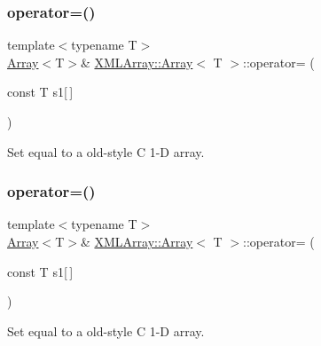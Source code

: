 \subsubsection{\texorpdfstring{operator=()}{operator=()}\hspace{0.1cm}{\footnotesize\ttfamily [8/9]}}
{\footnotesize\ttfamily template$<$typename T$>$ \\
\mbox{\hyperlink{classXMLArray_1_1Array}{Array}}$<$T$>$\& \mbox{\hyperlink{classXMLArray_1_1Array}{X\+M\+L\+Array\+::\+Array}}$<$ T $>$\+::operator= (\begin{DoxyParamCaption}\item[{const T}]{s1\mbox{[}$\,$\mbox{]} }\end{DoxyParamCaption})\hspace{0.3cm}{\ttfamily [inline]}}



Set equal to a old-\/style C 1-\/D array. 

\mbox{\label{classXMLArray_1_1Array_a73e85fb91d2c802400fa356bc3ce77e1}} 
\subsubsection{\texorpdfstring{operator=()}{operator=()}\hspace{0.1cm}{\footnotesize\ttfamily [9/9]}}
{\footnotesize\ttfamily template$<$typename T$>$ \\
\mbox{\hyperlink{classXMLArray_1_1Array}{Array}}$<$T$>$\& \mbox{\hyperlink{classXMLArray_1_1Array}{X\+M\+L\+Array\+::\+Array}}$<$ T $>$\+::operator= (\begin{DoxyParamCaption}\item[{const T}]{s1\mbox{[}$\,$\mbox{]} }\end{DoxyParamCaption})\hspace{0.3cm}{\ttfamily [inline]}}



Set equal to a old-\/style C 1-\/D array. 

\mbox{\label{classXMLArray_1_1Array_a42dbfab67d875b6fa456cade78f70f8f}} 
